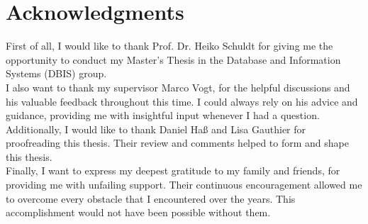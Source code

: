 \chapter{Acknowledgments}

First of all, I would like to thank Prof. Dr. Heiko Schuldt for giving me the opportunity to
conduct my Master's Thesis in the Database and Information Systems (DBIS) group.\\

I also want to thank my supervisor Marco Vogt, for the helpful discussions and his valuable
feedback throughout this time. I could always rely on his advice and guidance,
providing me with insightful input whenever I had a question.\\

Additionally, I would like to thank Daniel Haß and Lisa Gauthier for proofreading this thesis.
Their review and comments helped to form and shape this thesis.\\

Finally, I want to express my deepest gratitude to my family and friends, 
for providing me with unfailing support.
Their continuous encouragement allowed me to overcome every obstacle that I encountered
over the years.
This accomplishment would not have been possible without them.
